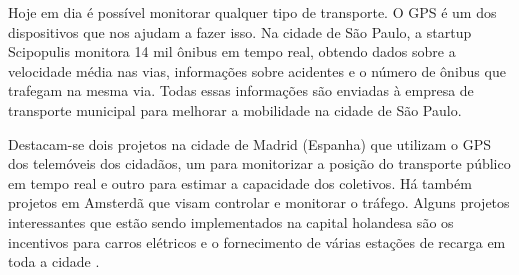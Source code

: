 Hoje em dia é possível monitorar qualquer tipo de transporte. O GPS é um dos dispositivos que nos ajudam a fazer isso. Na cidade de São Paulo, a startup Scipopulis monitora 14 mil ônibus em tempo real, obtendo dados sobre a velocidade média nas vias, informações sobre acidentes e o número de ônibus que trafegam na mesma via. Todas essas informações são enviadas à empresa de transporte municipal para melhorar a mobilidade na cidade de São Paulo.

Destacam-se dois projetos na cidade de Madrid (Espanha) que utilizam o GPS dos telemóveis dos cidadãos, um para monitorizar a posição do transporte público em tempo real e outro para estimar a capacidade dos coletivos. Há também projetos em Amsterdã que visam controlar e monitorar o tráfego. Alguns projetos interessantes que estão sendo implementados na capital holandesa são os incentivos para carros elétricos e o fornecimento de várias estações de recarga em toda a cidade \cite{kon}.








